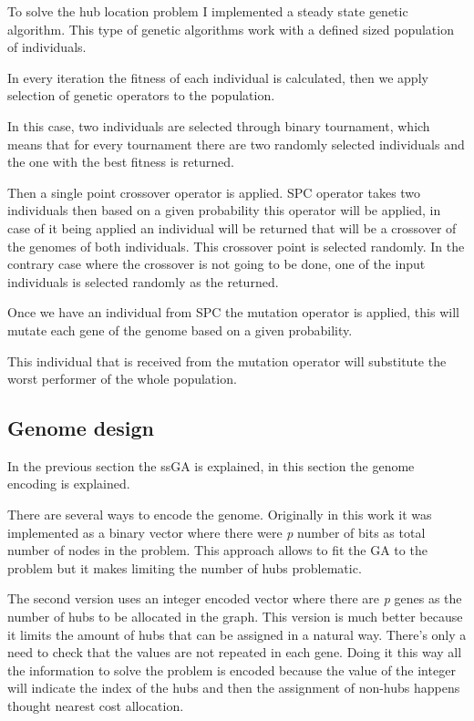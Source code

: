 \documentclass[12pt,oneside,a4paper]{article}
\begin{document}
    To solve the hub location problem I implemented a steady state genetic algorithm.
    This type of genetic algorithms work with a defined sized population of individuals.

    In every iteration the fitness of each individual is calculated, then we apply selection of genetic operators to
    the population.

    In this case, two individuals are selected through binary tournament, which means that for every tournament
    there are two randomly selected individuals and the one with the best fitness is returned.

    Then a single point crossover operator is applied.
    SPC operator takes two individuals then based on a given probability this operator will be applied, in case of it
    being applied an individual will be returned that will be a crossover of the genomes of both individuals.
    This crossover point is selected randomly.
    In the contrary case where the crossover is not going to be done, one of the input individuals is selected
    randomly as the returned.

    Once we have an individual from SPC the mutation operator is applied, this will mutate each gene of the genome
    based on a given probability.

    This individual that is received from the mutation operator will substitute the worst performer of the whole
    population.

    \subsection{Genome design}
    In the previous section the ssGA is explained, in this section the genome encoding is explained.

    There are several ways to encode the genome.
    Originally in this work it was implemented as a binary vector where there were \textit{p} number of bits as total
    number of nodes in the problem.
    This approach allows to fit the GA to the problem but it makes limiting the number of hubs problematic.

    The second version uses an integer encoded vector where there are \textit{p} genes as the number of hubs to be
    allocated in the graph.
    This version is much better because it limits the amount of hubs that can be assigned in a natural way.
    There's only a need to check that the values are not repeated in each gene.
    Doing it this way all the information to solve the problem is encoded because the value of the integer will
    indicate the index of the hubs and then the assignment of non-hubs happens thought nearest cost allocation.
\end{document}
